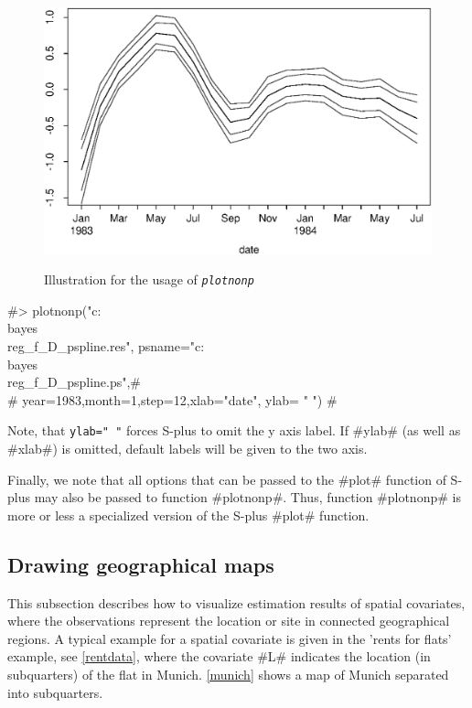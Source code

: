 \begin{figure}[ht]
\begin{center}
\includegraphics[scale=0.8]{grafiken/plotnonpdate.eps}
{\em\caption{ \label{illgraph2} Illustration for the usage of
\em\tt plotnonp}}
\end{center}
\end{figure}

#> plotnonp("c:\\bayes\\reg_f_D_pspline.res", psname="c:\\bayes\\reg_f_D_pspline.ps",#\\
#  year=1983,month=1,step=12,xlab="date", ylab= " ") #

Note, that \texttt{ylab=" "} forces S-plus to omit the y axis
label. If #ylab# (as well as #xlab#) is omitted, default labels
will be given to the two axis.

Finally, we note that all options that can be passed to the #plot#
function of S-plus may also be passed to function #plotnonp#.
Thus, function #plotnonp# is more or less a specialized version of
the S-plus #plot# function.


\subsection{Drawing geographical maps}  

This subsection describes how to visualize estimation results of
spatial covariates, where the observations represent the location
or site in connected geographical regions. A typical example for a
spatial covariate is given in the 'rents for flats' example, see
\autoref{rentdata}, where the covariate #L# indicates the location
(in subquarters) of the flat in Munich. \autoref{munich} shows a
map of Munich separated into subquarters.


